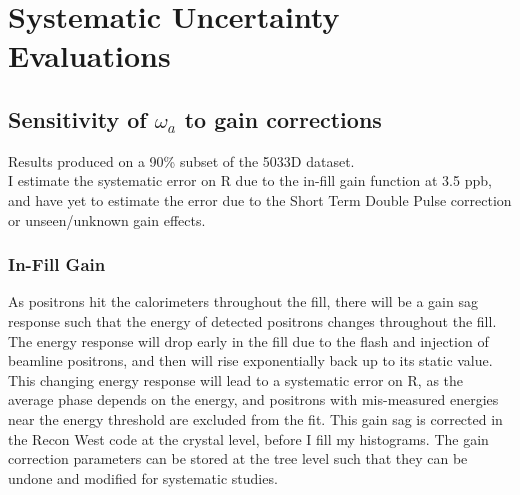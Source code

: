 \graphicspath{ {Figures/Pileup/Multiplier/} {Figures/Pileup/Phase/} {Figures/Pileup/EnergyScaling/} {Figures/RandomSeeds/FitStartScans/} {Figures/RandomSeeds/FitIterations/} {Figures/Miscellaneous/} {Figures/FitStartScans/} {Figures/CBO/Frequency/} {Figures/CBO/Shape/} {Figures/CBO/LifetimeScan/} {Figures/Gain/InFill/} {Figures/Gain/InFillCrystals/} {Figures/VW/} {Figures/LostMuons/} {Figures/BunchNumber/} }

\chapter{Systematic Uncertainty Evaluations}
\label{Ch:Systematics}

\section{Sensitivity of \texorpdfstring{$\omega_{a}$}{} to gain corrections}
\label{Sec:SystematicGain}

	Results produced on a 90\% subset of the 5033D dataset. \\

	I estimate the systematic error on R due to the in-fill gain function at 3.5 ppb, and have yet to estimate the error due to the Short Term Double Pulse correction or unseen/unknown gain effects. %

	\subsection{In-Fill Gain}

		As positrons hit the calorimeters throughout the fill, there will be a gain sag response such that the energy of detected positrons changes throughout the fill. The energy response will drop early in the fill due to the flash and injection of beamline positrons, and then will rise exponentially back up to its static value. This changing energy response will lead to a systematic error on R, as the average \gmtwo phase depends on the energy, and positrons with mis-measured energies near the energy threshold are excluded from the fit. This gain sag is corrected in the Recon West code at the crystal level, before I fill my histograms. The gain correction parameters can be stored at the tree level such that they can be undone and modified for systematic studies.

